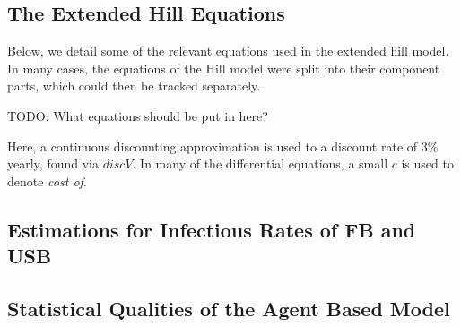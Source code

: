 \documentclass{amsart}
\begin{document}
\subsection{The Extended Hill Equations}
Below, we detail some of the relevant equations used in the extended hill model.
In many cases, the equations of the Hill model were split into their component
parts, which could then be tracked separately. 

{\huge \color{red} TODO: What equations should be put in here?}

Here, a continuous discounting approximation is used to a discount rate of $3\%$
yearly, found via $discV$. In many of the differential equations, a small $c$ is
used to denote \emph{cost of}. 
\FloatBarrier
\subsection{Estimations for Infectious Rates of FB and USB}

\subsection{Statistical Qualities of the Agent Based Model}
\end{document}
